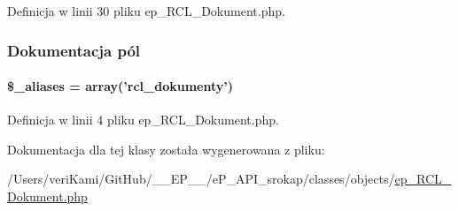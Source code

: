 Definicja w linii 30 pliku ep\-\_\-\-R\-C\-L\-\_\-\-Dokument.\-php.



\subsubsection{Dokumentacja pól}
\hypertarget{classep___r_c_l___dokument_ab4e31d75f0bc5d512456911e5d01366b}{
\paragraph[{\$\-\_\-aliases}]{\setlength{\rightskip}{0pt plus 5cm}\$\-\_\-aliases = array('rcl\-\_\-dokumenty')}}\label{classep___r_c_l___dokument_ab4e31d75f0bc5d512456911e5d01366b}


Definicja w linii 4 pliku ep\-\_\-\-R\-C\-L\-\_\-\-Dokument.\-php.



Dokumentacja dla tej klasy została wygenerowana z pliku\-:\begin{DoxyCompactItemize}
\item 
/\-Users/veri\-Kami/\-Git\-Hub/\-\_\-\-\_\-\-E\-P\-\_\-\-\_\-/e\-P\-\_\-\-A\-P\-I\-\_\-srokap/classes/objects/\hyperlink{ep___r_c_l___dokument_8php}{ep\-\_\-\-R\-C\-L\-\_\-\-Dokument.\-php}\end{DoxyCompactItemize}
